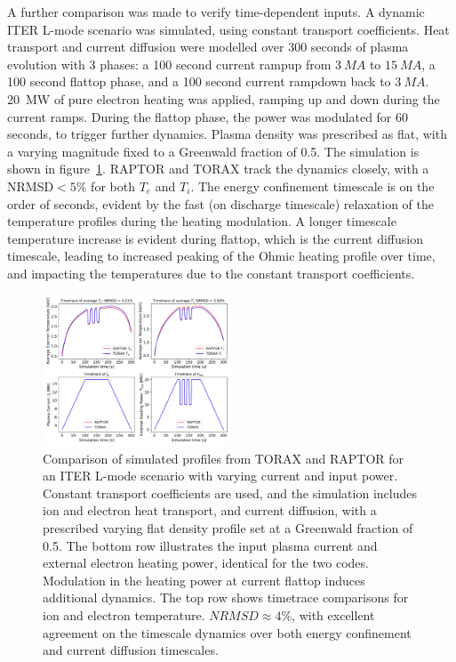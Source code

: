 \documentclass[aps, reprint, nofootinbib]{revtex4-2}
\begin{document}
A further comparison was made to verify time-dependent inputs. A dynamic ITER L-mode scenario was simulated, using constant transport coefficients. Heat transport and current diffusion were modelled over 300 seconds of plasma evolution with 3 phases: a 100 second current rampup from $3~MA$ to $15~MA$, a 100 second flattop phase, and a 100 second current rampdown back to $3~MA$. 20~MW of pure electron heating was applied, ramping up and down during the current ramps. During the flattop phase, the power was modulated for 60 seconds, to trigger further dynamics. Plasma density was prescribed as flat, with a varying magnitude fixed to a Greenwald fraction of 0.5. The simulation is shown in figure~\ref{fig:verification3}. RAPTOR and TORAX track the dynamics closely, with a NRMSD$<5\%$ for both $T_e$ and $T_i$. The energy confinement timescale is on the order of seconds, evident by the fast (on discharge timescale) relaxation of the temperature profiles during the heating modulation. A longer timescale temperature increase is evident during flattop, which is the current diffusion timescale, leading to increased peaking of the Ohmic heating profile over time, and impacting the temperatures due to the constant transport coefficients.

\begin{figure}[hbt]
    \centering
    \includegraphics[width=0.5\textwidth]{figure8_verification3.pdf}
    \caption{\footnotesize Comparison of simulated profiles from TORAX and RAPTOR for an ITER L-mode scenario with varying current and input power. Constant transport coefficients are used, and the simulation includes ion and electron heat transport, and current diffusion, with a prescribed varying flat density profile set at a Greenwald fraction of 0.5. The bottom row illustrates the input plasma current and external electron heating power, identical for the two codes. Modulation in the heating power at current flattop induces additional dynamics. The top row shows timetrace comparisons for ion and electron temperature. $NRMSD\approx4\%$, with excellent agreement on the timescale dynamics over both energy confinement and current diffusion timescales.}
    \label{fig:verification3}
\end{figure}
\end{document}
